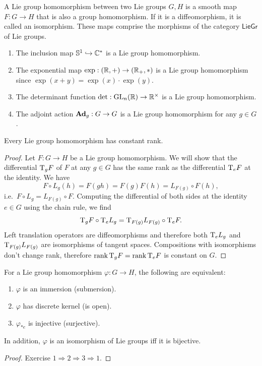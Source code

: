 \begin{defn}
    A Lie group homomorphism between two Lie groups $G,H$ is a smooth map $F:G\to H$ that is also a group homomorphism. If it is a diffeomorphism, it is called an isomorphism. These maps comprise the morphisms of the category $\mathsf{LieGr}$ of Lie groups.
\end{defn} 

\begin{example}
    \begin{enumerate}[label=(\alph*)]
        \item The inclusion map $\mathbb{S}^1\hookrightarrow \mathbb{C}^\ast$ is a Lie group homomorphism.
        \item The exponential map $\exp:(\mathbb{R} ,+)\to (\mathbb{R}_+,*)$ is a Lie group homomorphism since $\exp(x+y)=\exp(x)\cdot \exp(y)$.
        \item The determinant function $\det:\operatorname{GL}_n(\mathbb{R} )\to \mathbb{R}^\times$ is a Lie group homomorphism.
        \item The adjoint action $\mathrm{\mathbf{Ad}}_g:G\to G$ is a Lie group homomorphism for any $g\in G$.
    \end{enumerate}
\end{example}

\begin{thm}
    Every Lie group homomorphism has constant rank.
\end{thm}
\begin{proof}
    Let $F:G\to H$ be a Lie group homomorphism. We will show that the differential $\mathrm{T}_g F$ of $F$ at any $g\in G$ has the same rank as the differential $\mathrm{T}_eF$ at the identity. We have
    \[F\circ L_g (h)=F(gh)=F(g)F(h)=L_{F(g)}\circ F(h),\]
    i.e.~$F\circ L_g=L_{F(g)}\circ F$. Computing the differential of both sides at the identity $e\in G$ using the chain rule, we find
    \[\mathrm{T}_gF\circ \mathrm{T}_e L_g=\mathrm{T}_{F(g)}L_{F(g)}\circ \mathrm{T}_e F.\]
    Left translation operators are diffeomorphisms and therefore both $\mathrm{T}_e L_g$ and $\mathrm{T}_{F(g)}L_{F(g)}$ are isomorphisms of tangent spaces. Compositions with isomorphisms don't change rank, therefore $\operatorname{rank} \mathrm{T}_gF=\operatorname{rank} \mathrm{T}_e F$ is constant on $G$.
\end{proof}
\begin{cor}[{{\cite[Cor.~5.3.7]{RS1}}}]\label{cor 5.3.7 RS1}
    For a Lie group homomorphism $\varphi:G\to H$, the following are equivalent:
    \begin{enumerate}
        \item $\varphi$ is an immersion (submersion).
        \item $\varphi$ has discrete kernel (is open).
        \item $\varphi_{\ast e}$ is injective (surjective).
    \end{enumerate}
    In addition, $\varphi$ is an isomorphism of Lie groups iff it is bijective.
\end{cor}
\begin{proof}
    Exercise $1\Rightarrow 2\Rightarrow 3 \Rightarrow 1$.
\end{proof}

